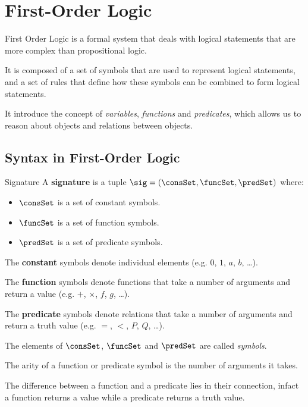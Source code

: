 \chapter{First-Order Logic}
\label{ch:First-Order Logic}

First Order Logic is a formal system that deals with logical statements 
that are more complex than propositional logic.

It is composed of a set of symbols that are used to represent logical statements,
and a set of rules that define how these symbols can be combined to form logical statements.

It introduce the concept of \textit{variables}, \textit{functions} and \textit{predicates},
which allows us to reason about objects and relations between objects.

\section{Syntax in First-Order Logic}
\label{sec:Syntax in First-Order Logic}

\begin{definition}{Signature}
    A \textbf{signature} is a tuple $\sig = (\consSet,\funcSet,\predSet)$ where:
    \begin{itemize}
        \item $\consSet$ is a set of constant symbols.
        \item $\funcSet$ is a set of function symbols.
        \item $\predSet$ is a set of predicate symbols.
    \end{itemize}
\end{definition}

The \textbf{constant} symbols denote individual elements (e.g. $0$, $1$, $a$, $b$, \dots).

The \textbf{function} symbols denote functions that take a number of arguments 
and return a value (e.g. $+$, $\times$, $f$, $g$, \dots).

The \textbf{predicate} symbols denote relations that take a number of arguments
and return a truth value (e.g. $=$, $<$, $P$, $Q$, \dots).

The elements of $\consSet$, $\funcSet$ and $\predSet$ are called \textit{symbols}.

The arity of a function or predicate symbol is the number of arguments it takes.

The difference between a function and a predicate lies in their 
connection, infact a function returns a value while a predicate returns a truth value.

